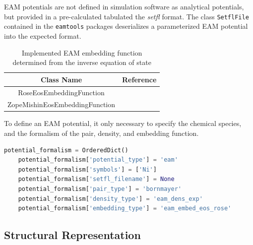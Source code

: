 EAM potentials are not defined in simulation software as analytical potentials, but provided in a pre-calculated tabulated the \emph{setfl} format.  The class \verb|SetflFile| contained in the \verb|eamtools| packages deserializes a parameterized EAM potential into the expected format.

\begin{table}[ht]
	\centering
	\caption{Implemented EAM embedding function determined from the inverse equation of state}
	\label{tbl:pypospack_eos_embedding_function}
	\begin{tabular}{cc}
		\hline
		{Class Name} & {Reference} \\
		\hline
		RoseEosEmbeddingFunction & \cite{foiles1984_eam_eos} \\
		ZopeMishinEosEmbeddingFunction & \cite{zope2003_eam_eos} \\
		\hline
	\end{tabular}
\end{table}

To define an EAM potential, it only necessary to specify the chemical species, and the formalism of the pair, density, and embedding function.
\begin{lstlisting}[language=Python]
	potential_formalism = OrderedDict()
	potential_formalism['potential_type'] = 'eam'
	potential_formalism['symbols'] = ['Ni']
	potential_formalism['setfl_filename'] = None
	potential_formalism['pair_type'] = 'bornmayer'
	potential_formalism['density_type'] = 'eam_dens_exp'
	potential_formalism['embedding_type'] = 'eam_embed_eos_rose'
\end{lstlisting}

\subsection{Structural Representation}
\label{sec:pypospack_structures}

